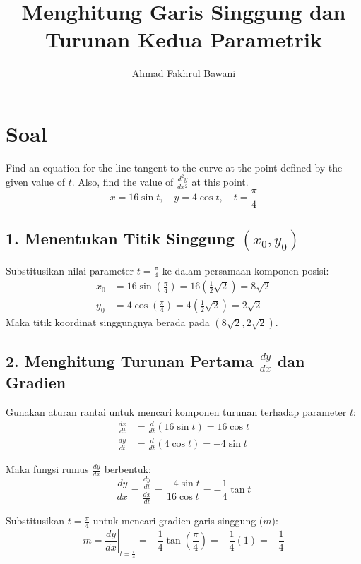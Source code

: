 \documentclass[12pt,a4paper]{article}
\title{Menghitung Garis Singgung dan Turunan Kedua Parametrik}
\author{Ahmad Fakhrul Bawani}
\date{}
\begin{document}
\maketitle

\section*{Soal}

Find an equation for the line tangent to the curve at the point defined by the given value of $t$. Also, find the value of $\frac{d^2y}{dx^2}$ at this point.
\begin{equation*}
  x = 16\sin t, \quad y = 4\cos t, \quad t = \frac{\pi}{4}
\end{equation*}

\subsection*{1. Menentukan Titik Singgung $(x_0, y_0)$}
Substitusikan nilai parameter $t = \frac{\pi}{4}$ ke dalam persamaan komponen posisi:
\begin{align*}
  x_0 &= 16\sin\left(\frac{\pi}{4}\right) = 16\left(\frac{1}{2}\sqrt{2}\right) = 8\sqrt{2} \\
  y_0 &= 4\cos\left(\frac{\pi}{4}\right) = 4\left(\frac{1}{2}\sqrt{2}\right) = 2\sqrt{2}
\end{align*}
Maka titik koordinat singgungnya berada pada \textbf{$\left(8\sqrt{2}, 2\sqrt{2}\right)$}.

\subsection*{2. Menghitung Turunan Pertama $\frac{dy}{dx}$ dan Gradien}
Gunakan aturan rantai untuk mencari komponen turunan terhadap parameter $t$:
\begin{align*}
  \frac{dx}{dt} &= \frac{d}{dt}(16\sin t) = 16\cos t \\
  \frac{dy}{dt} &= \frac{d}{dt}(4\cos t) = -4\sin t
\end{align*}

Maka fungsi rumus $\frac{dy}{dx}$ berbentuk:
\begin{equation*}
  \frac{dy}{dx} = \frac{\frac{dy}{dt}}{\frac{dx}{dt}} = \frac{-4\sin t}{16\cos t} = -\frac{1}{4}\tan t
\end{equation*}

Substitusikan $t = \frac{\pi}{4}$ untuk mencari gradien garis singgung ($m$):
\begin{equation*}
  m = \left. \frac{dy}{dx} \right|_{t=\frac{\pi}{4}} = -\frac{1}{4}\tan\left(\frac{\pi}{4}\right) = -\frac{1}{4}(1) = -\frac{1}{4}
\end{equation*}
\end{document}
